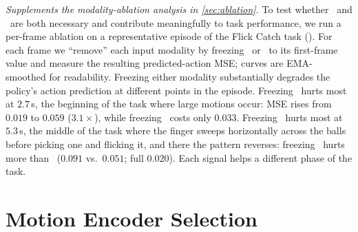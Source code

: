 \emph{Supplements the modality-ablation analysis in \cref{sec:ablation}.}
To test whether \TEMPOMOT\ and \TEMPOACT\ are both necessary and contribute meaningfully to task performance, we run a per-frame ablation on a representative episode of the Flick Catch task (). For each frame we ``remove'' each input modality by freezing \TEMPOMOT\ or \TEMPOACT\ to its first-frame value and measure the resulting predicted-action MSE; curves are EMA-smoothed for readability. Freezing either modality substantially degrades the policy's action prediction at different points in the episode. Freezing \TEMPOMOT\ hurts most at $2.7$\,s, the beginning of the task where large motions occur: MSE rises from $0.019$ to $0.059$ ($3.1\times$), while freezing \TEMPOACT\ costs only $0.033$. Freezing \TEMPOACT\ hurts most at $5.3$\,s, the middle of the task where the finger sweeps horizontally across the balls before picking one and flicking it, and there the pattern reverses: freezing \TEMPOACT\ hurts more than \TEMPOMOT\ ($0.091$ vs.\ $0.051$; full $0.020$). Each signal helps a different phase of the task.

\section{Motion Encoder Selection}
\label{app:motion_encoder}

